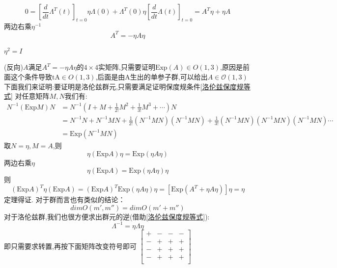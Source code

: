 \documentclass[../main.tex]{subfiles}
\begin{document}
$$ 0 =\left[\frac{d}{dt}\Lambda^T(t)\right]_{t = 0} \eta \Lambda(0)+ \Lambda^T(0) \eta\left[\frac{d}{dt}\Lambda(t)\right]_{t = 0} = A^T\eta + \eta A$$
两边右乘$\eta^{-1}$
$$A^T = -\eta A \eta$$
\begin{note}
 $\eta^2 = I$
\end{note}
(反向)$A$满足$A^T = - \eta A \eta $的$4\times 4$实矩阵,只需要证明$\text{Exp}(A) \in O(1,3) $,原因是前面这个条件导致$\text{tA} \in O(1,3)$,后面是由A生出的单参子群,可以给出$A \in \mathscr{O}(1,3)$
下面我们来证明:要证明是洛伦兹群元,只需要满足证明保度规条件\ref{洛伦兹保度规等式}
对任意矩阵$M,N$我们有:
\begin{align*}
    N^{-1}(\text{Exp}M)N &= N^{-1}(I + M + \frac{1}{2!}M^2 + \frac{1}{3!}M^3 + \cdots )N\\
            &=N^{-1}N +N^{-1}MN + \frac{1}{2!} (N^{-1}MN) (N^{-1}MN) + \frac{1}{3!} (N^{-1}MN) (N^{-1}MN) (N^{-1}MN) \cdots\\
            &=\text{Exp}(N^{-1}MN)
\end{align*}
取$N=\eta ,M = A$,则
$$\eta(\text{Exp}A)\eta = \text{Exp}(\eta A \eta)$$
两边右乘$\eta$
$$\eta(\text{Exp}A) = \text{Exp}(\eta A \eta)\eta$$
则
$$(\text{Exp}A)^T \eta (\text{Exp}A) = (\text{Exp}A)^T\text{Exp}(\eta A \eta)\eta = [\text{Exp}(A^T + \eta A \eta) ]\eta = \eta$$
定理得证.
对于群而言也有类似的结论：
$$dimO(m',m'') = dimO(m'+m'')$$
对于洛伦兹群,我们也很方便求出群元的逆(借助\ref{洛伦兹保度规等式}):
$$ \Lambda^{-1} = \eta \Lambda \eta $$
即只需要求转置,再按下面矩阵改变符号即可
$\begin{bmatrix}
    +&-&-&-\\
    -&+&+&+\\
    -&+&+&+\\
    -&+&+&+\\
\end{bmatrix}$
\end{document}
